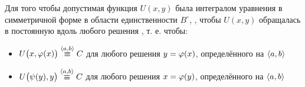 \begin{theorem}
    Для того чтобы допустимая функция $ U(x, y) $ была интегралом уравнения в симметричной форме  в области единственности $ B^\circ $, , чтобы $ U(x, y) $ обращалась в постоянную вдоль любого решения , т. е. чтобы:
    \begin{itemize}
        \item $ U \big( x, \vphi(x) \big) \overset{\braket{a, b}}\equiv C $ для любого решения $ y = \varphi(x) $, определённого на $ \Braket{a, b} $
        \item $ U \big( \psi(y), y \big) \overset{\braket{a, b}}\equiv C $ для любого решения $ x = \varphi(y) $, определённого на $ \Braket{a, b} $
    \end{itemize}
\end{theorem}

